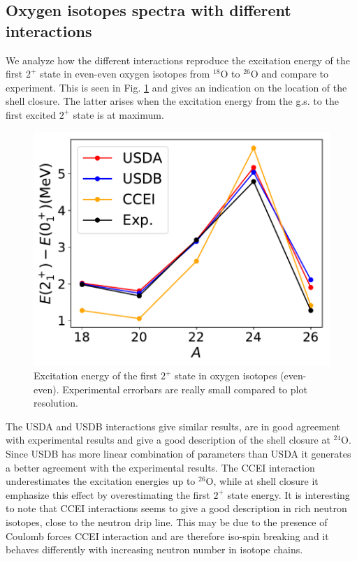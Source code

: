 \subsection{Oxygen isotopes spectra with different interactions} \label{Oxygen}
%
We analyze how the different interactions reproduce the excitation energy of the first $2^+$ state in even-even oxygen isotopes from $^{18}$O to $^{26}$O and compare to experiment. This is seen in Fig. \ref{fig:2+/0+}   and gives an indication on the location of the shell closure. The latter  arises when the excitation energy from the g.s. to the first excited $2^+$ state is at maximum.

\begin{figure}[htb!]
\centering
\includegraphics[width=1\linewidth]{2+_over_0+.pdf}
\caption{Excitation energy of the first $2^+$ state in oxygen isotopes (even-even). Experimental errorbars are really small compared to plot resolution.}
\label{fig:2+/0+}
\end{figure}

The USDA and USDB interactions give similar results,  are in good agreement with experimental results and give a good description of the shell closure at $^{24}$O. Since USDB has more linear combination of parameters than USDA it generates a better agreement with the experimental results. 
The CCEI interaction underestimates the excitation energies up to $^{26}$O, while at shell closure it emphasize this effect by overestimating the first $2^+$ state energy. 
It is interesting to note that CCEI interactions seems to give a good description in rich neutron isotopes, close to the neutron drip line. This may be due to the presence of Coulomb forces CCEI interaction and are therefore iso-spin breaking and it behaves differently with increasing neutron number in isotope chains.

